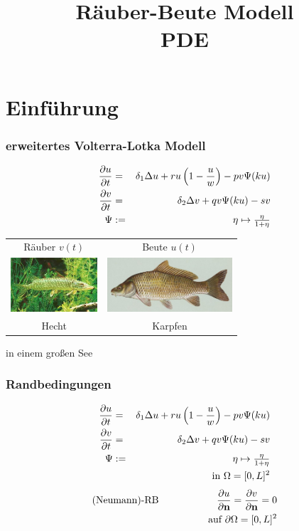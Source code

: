 \documentclass[10pt]{beamer}
\title[Räuber-Beute Modell]{Räuber-Beute Modell\\PDE}
\institute[Computerphysik]{Computerphysik WS 18/19}
\date[]{}
\begin{document}
\frame{\titlepage}

\section{Einführung}
\frame
{
  \frametitle{erweitertes Volterra-Lotka Modell}
\begin{eqnarray*}
\frac{\partial u}{\partial t} &=& \delta_1 \Delta u + r u \left(1 - \frac{u}{w} \right) - p v \Psi(k u) \\
\frac{\partial v}{\partial t} &=& \delta_2 \Delta v + q v \Psi(k u) - s v \notag \\
\Psi &:=& \eta \mapsto \tfrac{\eta}{1+\eta} \notag
\end{eqnarray*}
\begin{center}
\begin{tabular}{cc}
 Räuber $v(t)$ & Beute $u(t)$\\ 
 \includegraphics[height=2cm]{img/Hecht.jpg} & \includegraphics[height=2cm]{img/Karpfen.jpg}\\ 
 Hecht & Karpfen 
\end{tabular}
\end{center}
\begin{flushright}
 in einem großen See
\end{flushright}
}




\frame
{
  \frametitle{Randbedingungen}
\begin{eqnarray*}
\frac{\partial u}{\partial t} &=& \delta_1 \Delta u + r u \left(1 - \frac{u}{w} \right) - p v \Psi(k u) \\
\frac{\partial v}{\partial t} &=& \delta_2 \Delta v + q v \Psi(k u) - s v \notag \\
\Psi &:=& \eta \mapsto \tfrac{\eta}{1+\eta} \notag \\
&& \qquad \qquad  \text{in } \Omega = [0, L]^2 \notag \\
\end{eqnarray*}
\vspace{1pt}
\begin{eqnarray*}
  \text{(Neumann)-RB} && \frac{\partial u}{\partial\mathbf n}=\frac{\partial v}{\partial\mathbf n} = 0 \notag\\
  &&\qquad \qquad \text{auf }  \partial\Omega = [0, L]^2 \\
\end{eqnarray*}
}
\end{document}
